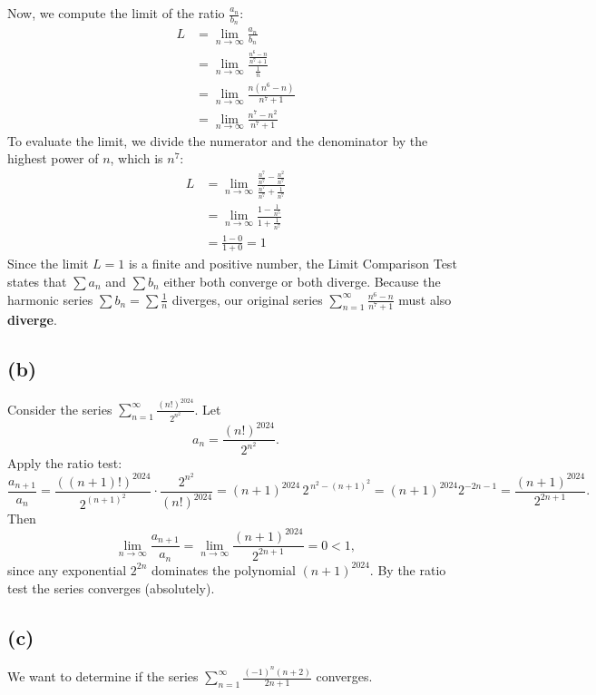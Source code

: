 \documentclass[12pt,a4paper]{article}
\theoremstyle{definition}
\theoremstyle{remark}
\begin{document}
Now, we compute the limit of the ratio $\frac{a_n}{b_n}$:
\begin{align*}
    L &= \lim_{n \to \infty} \frac{a_n}{b_n} \\
      &= \lim_{n \to \infty} \frac{\frac{n^6 - n}{n^7 + 1}}{\frac{1}{n}} \\
      &= \lim_{n \to \infty} \frac{n(n^6 - n)}{n^7 + 1} \\
      &= \lim_{n \to \infty} \frac{n^7 - n^2}{n^7 + 1}
\end{align*}
To evaluate the limit, we divide the numerator and the denominator by the highest power of $n$, which is $n^7$:
\begin{align*}
    L &= \lim_{n \to \infty} \frac{\frac{n^7}{n^7} - \frac{n^2}{n^7}}{\frac{n^7}{n^7} + \frac{1}{n^7}} \\
      &= \lim_{n \to \infty} \frac{1 - \frac{1}{n^5}}{1 + \frac{1}{n^7}} \\
      &= \frac{1 - 0}{1 + 0} = 1
\end{align*}
Since the limit $L=1$ is a finite and positive number, the Limit Comparison Test states that $\sum a_n$ and $\sum b_n$ either both converge or both diverge.
Because the harmonic series $\sum b_n = \sum \frac{1}{n}$ diverges, our original series $\sum_{n=1}^{\infty} \frac{n^6 - n}{n^7 + 1}$ must also \textbf{diverge}.




\subsection*{(b)}
Consider the series $\displaystyle \sum_{n=1}^\infty \frac{(n!)^{2024}}{2^{n^{2}}}$. Let
\[
a_n=\frac{(n!)^{2024}}{2^{n^{2}}}.
\]
Apply the ratio test:
\[
\frac{a_{n+1}}{a_n}
= \frac{((n+1)!)^{2024}}{2^{(n+1)^2}} \cdot \frac{2^{n^{2}}}{(n!)^{2024}}
= (n+1)^{2024}\, 2^{\,n^{2}-(n+1)^2}
= (n+1)^{2024} 2^{-2n-1}
= \frac{(n+1)^{2024}}{2^{2n+1}}.
\]
Then
\[
\lim_{n\to\infty} \frac{a_{n+1}}{a_n}
= \lim_{n\to\infty} \frac{(n+1)^{2024}}{2^{2n+1}} = 0 < 1,
\]
since any exponential $2^{2n}$ dominates the polynomial $(n+1)^{2024}$. By the ratio test the series converges (absolutely).



\subsection*{(c)}
We want to determine if the series $\sum_{n=1}^{\infty} \frac{(-1)^n (n+2)}{2n+1}$ converges.
\end{document}
